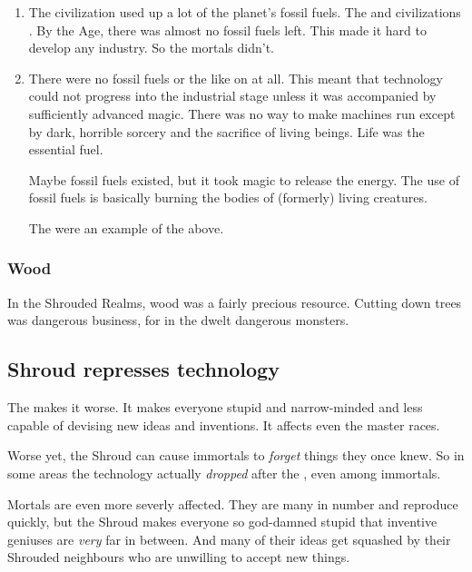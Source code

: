 \begin{enumerate}
  \item 
    The \ophidian civilization used up a lot of the planet's fossil fuels. 
    The \quiljaaran and \aryoth civilizations .
    By the \Human Age, there was almost no fossil fuels left.
    This made it hard to develop any industry. 
    So the mortals didn't. 
  \item 
    There were no fossil fuels or the like on \Miith at all. 
    This meant that technology could not progress into the industrial stage unless it was accompanied by sufficiently advanced magic. 
    There was no way to make machines run except by dark, horrible sorcery and the sacrifice of living beings. 
    Life was the essential fuel. 
    
    Maybe fossil fuels existed, but it took magic to release the energy.
    The use of fossil fuels is basically burning the bodies of (formerly) living creatures. 
    
    The  were an example of the above. 
\end{enumerate}





\subsubsection{Wood}
In the Shrouded Realms, wood was a fairly precious resource. 
Cutting down trees was dangerous business, for in the \wylde dwelt dangerous monsters. 










\subsection{Shroud represses technology}
The  makes it worse. 
It makes everyone stupid and narrow-minded and less capable of devising new ideas and inventions.
It affects even the master races. 

Worse yet, the Shroud can cause immortals to \emph{forget} things they once knew. 
So in some areas the technology actually \emph{dropped} after the \secondbanewar, even among immortals. 

Mortals are even more severly affected. 
They are many in number and reproduce quickly, but the Shroud makes everyone so god-damned stupid that inventive geniuses are \emph{very} far in between. 
And many of their ideas get squashed by their Shrouded neighbours who are unwilling to accept new things. 

